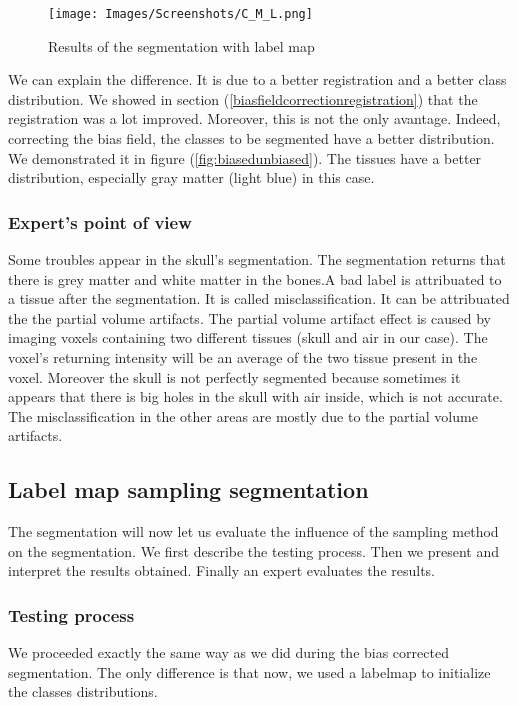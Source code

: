   \begin{figure}\centering
  \texttt{[image: Images/Screenshots/C\_M\_L.png]}
  \caption{Results of the segmentation with label map}\label{fig:C_M_L}
  \end{figure}

%
%
\par
We can explain the difference. It is due to a better registration and a better class distribution. We showed in section (\ref{biasfieldcorrectionregistration}) that the registration was a lot improved. Moreover, this is not the only avantage. Indeed, correcting the bias field, the classes to be segmented have a better distribution. We  demonstrated it in figure (\ref{fig:biasedunbiased}). The tissues have a better distribution, especially gray matter (light blue) in this case.
%
\subsubsection{Expert's point of view}
Some troubles appear in the skull's segmentation. The segmentation returns that there is grey matter and white matter in the bones.A bad label is attribuated to a tissue after the segmentation. It is called misclassification. It can be attribuated the the partial volume artifacts. The partial volume artifact effect is caused by imaging voxels containing two different tissues (skull and air in our case). The voxel's returning intensity will be an average of the two tissue present in the voxel. Moreover the skull is not perfectly segmented because sometimes it appears that there is big holes in the skull with air inside, which is not accurate. The misclassification in the other areas are mostly due to the partial volume artifacts.
%
\subsection{Label map sampling segmentation}
The segmentation  will now let us evaluate the influence of the sampling method on the segmentation. We first describe the testing process. Then we present and interpret the results obtained. Finally an expert evaluates the results.
%
\subsubsection{Testing process}
We proceeded exactly the same way as we did during the bias corrected segmentation. The only difference is that now, we used a labelmap to initialize the classes distributions.
%

